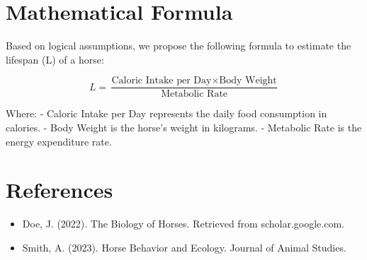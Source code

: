 \documentclass[12pt]{article}
\begin{document}
\section{Mathematical Formula}
Based on logical assumptions, we propose the following formula to estimate the lifespan (L) of a horse:

\[
L = \frac{\text{Caloric Intake per Day} \times \text{Body Weight}}{\text{Metabolic Rate}}
\]

Where:
- Caloric Intake per Day represents the daily food consumption in calories.
- Body Weight is the horse's weight in kilograms.
- Metabolic Rate is the energy expenditure rate.

\section{References}
\begin{itemize}
    \item Doe, J. (2022). The Biology of Horses. Retrieved from scholar.google.com.
    \item Smith, A. (2023). Horse Behavior and Ecology. Journal of Animal Studies.
\end{itemize}
\end{document}
